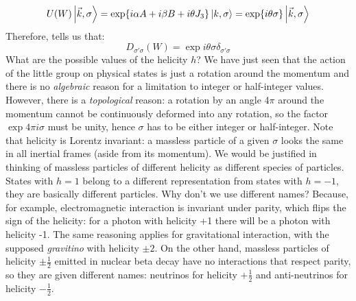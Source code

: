 \documentclass[../main.tex]{subfiles}
\begin{document}
\[
U(W)\ket{\vec{k},\sigma}=\exp{i\alpha A+i\beta B+i\theta J_3}\ket{k,\sigma}=\exp{i\theta\sigma}\ket{\vec{k},\sigma}
\]
Therefore,  tells us that:
\[
D_{\sigma'\sigma}(W)=\exp{i\theta\sigma}\delta_{\sigma'\sigma}
\]
What are the possible values of the helicity $h$? We have just seen that the action of the little group on physical states is just a rotation around the momentum and there is no \textit{algebraic} reason for a limitation to integer or half-integer values. However, there is a \textit{topological} reason: a rotation by an angle 4$\pi$ around the momentum cannot be continuously deformed into any rotation, so the factor $\exp{4\pi i\sigma}$ must be unity, hence $\sigma$ has to be either integer or half-integer. Note that helicity is Lorentz invariant: a massless particle of a given $\sigma$ looks the same in all inertial frames (aside from its momentum). We would be justified in thinking of massless particles of different helicity as different species of particles. States with $h=1$ belong to a different representation from states with $h=-1$, they are basically different particles. Why don't we use different names? Because, for example, electromagnetic interaction is invariant under parity, which flips the sign of the helicity: for a photon with helicity +1 there will be a photon with helicity -1. The same reasoning applies for gravitational interaction, with the supposed \textit{gravitino} with helicity $\pm2$. On the other hand, massless particles of helicity $\pm\frac{1}{2}$ emitted in nuclear beta decay have no interactions that respect parity, so they are given different names: neutrinos for helicity $+\frac{1}{2}$ and anti-neutrinos for helicity $-\frac{1}{2}$.\\
\end{document}
